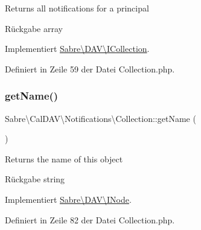 Returns all notifications for a principal

\begin{DoxyReturn}{Rückgabe}
array 
\end{DoxyReturn}


Implementiert \mbox{\hyperlink{interface_sabre_1_1_d_a_v_1_1_i_collection_a5344a6890e49fd7a81bb0e38b4c6d0be}{Sabre\textbackslash{}\+D\+A\+V\textbackslash{}\+I\+Collection}}.



Definiert in Zeile 59 der Datei Collection.\+php.

\mbox{\label{class_sabre_1_1_cal_d_a_v_1_1_notifications_1_1_collection_a611b7fd53e6e29320c1a627bc964da3e}} 
\subsubsection{\texorpdfstring{get\+Name()}{getName()}}
{\footnotesize\ttfamily Sabre\textbackslash{}\+Cal\+D\+A\+V\textbackslash{}\+Notifications\textbackslash{}\+Collection\+::get\+Name (\begin{DoxyParamCaption}{ }\end{DoxyParamCaption})}

Returns the name of this object

\begin{DoxyReturn}{Rückgabe}
string 
\end{DoxyReturn}


Implementiert \mbox{\hyperlink{interface_sabre_1_1_d_a_v_1_1_i_node_ab616fe836b1ae36af12126a2bc934dce}{Sabre\textbackslash{}\+D\+A\+V\textbackslash{}\+I\+Node}}.



Definiert in Zeile 82 der Datei Collection.\+php.

\mbox{\label{class_sabre_1_1_cal_d_a_v_1_1_notifications_1_1_collection_a2da08679114fa20070147096aacfca72}} 
